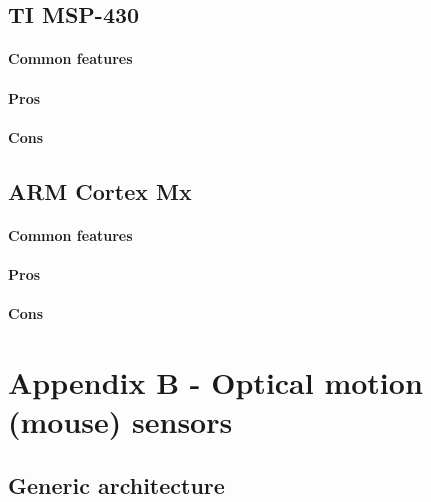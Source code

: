 \documentclass[a4paper,10pt]{article}
\begin{document}
\begin{multicols}{2}
\subsection{TI MSP-430}

\TODO


\paragraph{Common features}
\TODO


\paragraph{Pros}
\TODO


\paragraph{Cons}
\TODO


\subsection{ARM Cortex Mx}

\TODO


\paragraph{Common features}
\TODO


\paragraph{Pros}
\TODO


\paragraph{Cons}
\TODO


\section{Appendix B - Optical motion (mouse) sensors}

\TODO


\subsection{Generic architecture}


\end{multicols}
\end{document}
